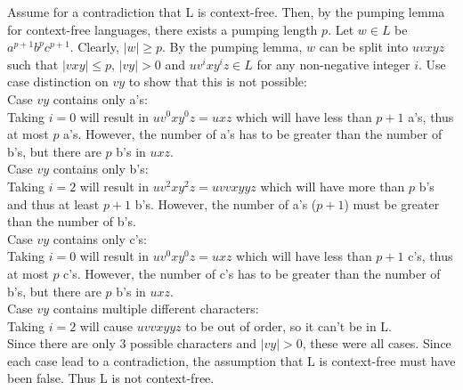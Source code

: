 \documentclass{article}
\begin{document}
Assume for a contradiction that L is context-free. 
Then, by the pumping lemma for context-free languages, there exists a pumping length $p$. 
Let $w \in L$ be $a^{p+1}b^pc^{p+1}$. Clearly, $|w| \geq p$.
By the pumping lemma, $w$ can be split into $uvxyz$ such that $|vxy| \leq p$, $|vy| > 0$ and  $uv^ixy^iz \in L$ for any non-negative integer $i$.
Use case distinction on $vy$ to show that this is not possible:\\
Case $vy$ contains only a's:\\
Taking $i = 0$ will result in $uv^0xy^0z = uxz$ which will have less than $p + 1$ a's, thus at most $p$ a's.
However, the number of a's has to be greater than the number of b's, but there are $p$ b's in $uxz$.\\
Case $vy$ contains only b's:\\
Taking $i = 2$ will result in $uv^2xy^2z = uvvxyyz$ which will have more than $p$ b's and thus at least $p + 1$ b's.
However, the number of a's ($p + 1$) must be greater than the number of b's.\\
Case $vy$ contains only c's:\\
Taking $i = 0$ will result in $uv^0xy^0z = uxz$ which will have less than $p + 1$ c's, thus at most $p$ c's.
However, the number of c's has to be greater than the number of b's, but there are $p$ b's in $uxz$.\\
Case $vy$ contains multiple different characters:\\
Taking $i = 2$ will cause $uvvxyyz$ to be out of order, so it can't be in L.\\
Since there are only 3 possible characters and $|vy| > 0$, these were all cases.
Since each case lead to a contradiction, the assumption that L is context-free must have been false.
Thus L is not context-free.
\end{document}
